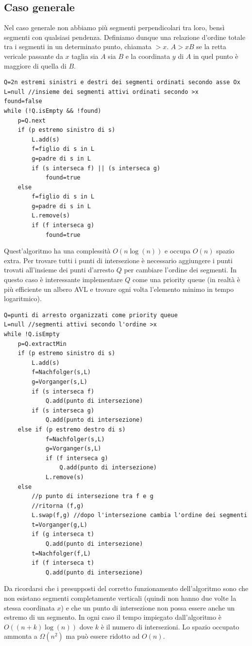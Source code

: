 \documentclass[a4paper]{book}
\newcommand{\lstIndent}{4}
\begin{document}
\subsection{Caso generale}
Nel caso generale non abbiamo più segmenti perpendicolari tra loro, bensì segmenti con qualsiasi pendenza. Definiamo dunque una relazione d'ordine totale tra i segmenti in un determinato punto, chiamata $>x$. $A >x B$ se la retta vericale passante da $x$ taglia sia $A$ sia $B$ e la coordinata $y$ di $A$ in quel punto è maggiore di quella di $B$.
\begin{lstlisting}[tabsize=\lstIndent]
Q=2n estremi sinistri e destri dei segmenti ordinati secondo asse Ox
L=null //insieme dei segmenti attivi ordinati secondo >x
found=false
while (!Q.isEmpty && !found)
	p=Q.next
	if (p estremo sinistro di s)
		L.add(s)
		f=figlio di s in L
		g=padre di s in L
		if (s interseca f) || (s interseca g)
			found=true
	else
		f=figlio di s in L
		g=padre di s in L
		L.remove(s)
		if (f interseca g)
			found=true		
\end{lstlisting}
Quest'algoritmo ha una complessità $O(n\log (n))$ e occupa $O(n)$ spazio extra.
Per trovare tutti i punti di intersezione è necessario aggiungere i punti trovati all'insieme dei punti d'arresto $Q$ per cambiare l'ordine dei segmenti. In questo caso è interessante implementare $Q$ come una priority queue (in realtà è più efficiente un albero AVL e trovare ogni volta l'elemento minimo in tempo logaritmico). 
\begin{lstlisting}[tabsize=\lstIndent]
Q=punti di arresto organizzati come priority queue
L=null //segmenti attivi secondo l'ordine >x
while !Q.isEmpty
	p=Q.extractMin
	if (p estremo sinistro di s)
		L.add(s)
		f=Nachfolger(s,L)
		g=Vorganger(s,L)
		if (s interseca f)
			Q.add(punto di intersezione)
		if (s interseca g)
			Q.add(punto di intersezione)
	else if (p estremo destro di s)
			f=Nachfolger(s,L)
			g=Vorganger(s,L)
			if (f interseca g)
				Q.add(punto di intersezione)
			L.remove(s)
	else
		//p punto di intersezione tra f e g
		//ritorna (f,g)
		L.swap(f,g) //dopo l'intersezione cambia l'ordine dei segmenti
		t=Vorganger(g,L)
		if (g interseca t)
			Q.add(punto di intersezione)
		t=Nachfolger(f,L)
		if (f interseca t)
			Q.add(punto di intersezione)	 						
\end{lstlisting}
Da ricordarsi che i presupposti del corretto funzionamento dell'algoritmo sono che non esistano segmenti completamente verticali (quindi non hanno due volte la stessa coordinata $x$) e che un punto di intersezione non possa essere anche un estremo di un segmento. In ogni caso il tempo impiegato dall'algoritmo è $O((n+k)\log (n))$ dove $k$ è il numero di intersezioni. Lo spazio occupato ammonta a $\Omega (n^2)$ ma può essere ridotto ad $O(n)$.
\end{document}
